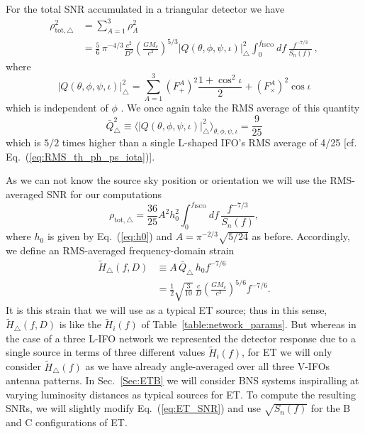 \documentclass[amsmath,amssymb,aps,floats,amsfonts,notitlepage,superscriptaddress,eqsecnum,nofootinbib,10pt]{revtex4-1}
\newcommand{\nn}{\nonumber}
\newcommand{\f}{\frac}
\newcommand{\be}{\begin{equation}}
\newcommand{\ee}{\end{equation}}
\begin{document}
For the total SNR accumulated in a triangular detector we have
%
\begin{align}
\rho^2_{\text{tot},\bigtriangleup} & = \sum_{A=1}^3 \rho_A^2 \nn \\
 & =  \f{5}{6}\, \pi^{-4/3} \f{c^2}{D^2}\left(\f{G M_c}{c^3}\right)^{5/3}|Q(\theta,\phi,\psi,\iota)|_\bigtriangleup^2 \int_0^{f_\text{ISCO}} d f\, \f{f^{-7/3}}{S_n(f)} \, ,\label{eq:ET_SNRsq}
\end{align}
where
%
\be
|Q(\theta,\phi,\psi,\iota)|_\bigtriangleup^2 = \sum_{A=1}^3 \left(F^A_+\right)^2\f{1+\cos^2\iota}{2}  + \left(F^A_\times\right)^2 \cos\iota \label{eq:Q_sq_ET}
\ee
%
which is independent of $\phi$ \cite{Regimbau:2012ir}. We once again take the RMS average of this quantity
%
\be
\bar{Q}^2_\bigtriangleup\equiv\langle |Q(\theta,\phi,\psi,\iota)|_\bigtriangleup^2 \rangle_{\theta,\phi,\psi,\iota} = \f{9}{25}\label{eq:RMS_ET}
\ee
%
which is $5/2$ times higher than a single L-shaped IFO's RMS average of 4/25 [cf. Eq.~(\ref{eq:RMS_th_ph_ps_iota})].

As we can not know the source sky position or orientation we will use the RMS-averaged SNR for our computations %
%
\be
\rho_{\text{tot},\bigtriangleup} = \f{36}{25}A^2 h_0^2 \int_0^{f_\text{ISCO}} d f\, \f{f^{-7/3}}{S_n(f)} \label{eq:ET_SNR},
\ee
where $h_0$ is given by Eq.~(\ref{eq:h0}) and $A=\pi^{-2/3}\sqrt{5/24}$ as before. %
Accordingly, we define an RMS-averaged frequency-domain
strain
%
\begin{align}
\tilde{H}_\bigtriangleup(f, D)&\equiv A\,  \bar{Q}_\bigtriangleup\, h_0 f^{-7/6} \nn \\
   & = \f{1}{2}\sqrt{\f{3}{10}}\, \f{c}{D}\left(\f{G M_c}{c^3}\right)^{5/6} f^{-7/6}. \label{eq:H_delta}
\end{align}
%
It is this strain that we will use as a typical ET source; thus in this sense,
$\tilde{H}_\bigtriangleup(f,D)$ is like the $\tilde{H}_i(f)$ of Table~\ref{table:network_params}.
But whereas in the case of a three L-IFO network we represented the detector response due to a single source in terms of three different
values $\tilde{H}_i(f)$, for ET we will only consider $\tilde{H}_\bigtriangleup(f)$ as we have already angle-averaged over all three V-IFOs antenna patterns.
In Sec.~\ref{Sec:ETB} we will consider BNS systems inspiralling at varying luminosity distances as typical sources for ET.
To compute the resulting SNRs, we will slightly modify Eq.~(\ref{eq:ET_SNR}) and use $\sqrt{S_n(f)}$ for the B and C configurations of ET.
\end{document}
